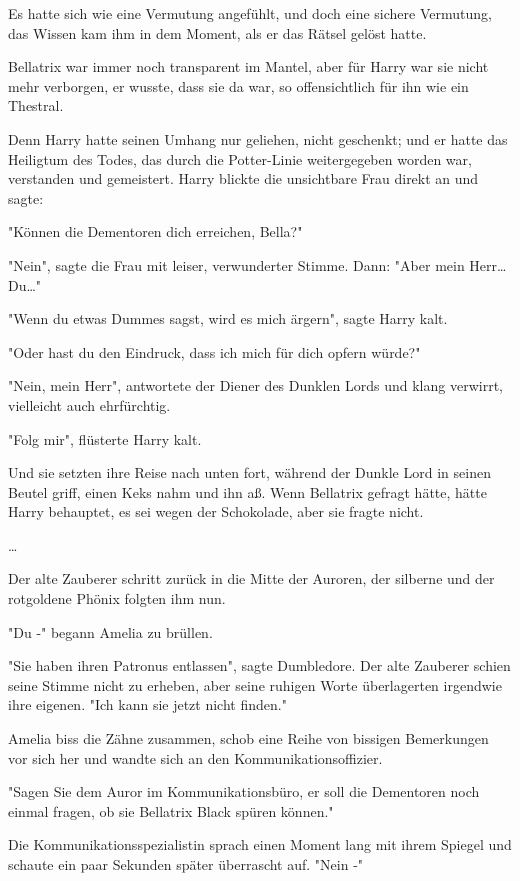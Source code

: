 {Es hatte sich wie eine Vermutung angefühlt, und doch eine sichere Vermutung, das Wissen kam ihm in dem Moment, als er das Rätsel gelöst hatte.

Bellatrix war immer noch transparent im Mantel, aber für Harry war sie nicht mehr verborgen, er wusste, dass sie da war, so offensichtlich für ihn wie ein Thestral.

Denn Harry hatte seinen Umhang nur geliehen, nicht geschenkt; und er hatte das Heiligtum des Todes, das durch die Potter-Linie weitergegeben worden war, verstanden und gemeistert. Harry blickte die unsichtbare Frau direkt an und sagte:

"Können die Dementoren dich erreichen, Bella?"

"Nein", sagte die Frau mit leiser, verwunderter Stimme. Dann: "Aber mein Herr… Du…"

"Wenn du etwas Dummes sagst, wird es mich ärgern", sagte Harry kalt.

"Oder hast du den Eindruck, dass ich mich für dich opfern würde?"

"Nein, mein Herr", antwortete der Diener des Dunklen Lords und klang verwirrt, vielleicht auch ehrfürchtig.

"Folg mir", flüsterte Harry kalt.

Und sie setzten ihre Reise nach unten fort, während der Dunkle Lord in seinen Beutel griff, einen Keks nahm und ihn aß. Wenn Bellatrix gefragt hätte, hätte Harry behauptet, es sei wegen der Schokolade, aber sie fragte nicht.

…

Der alte Zauberer schritt zurück in die Mitte der Auroren, der silberne und der rotgoldene Phönix folgten ihm nun.

"Du -" begann Amelia zu brüllen.

"Sie haben ihren Patronus entlassen", sagte Dumbledore. Der alte Zauberer schien seine Stimme nicht zu erheben, aber seine ruhigen Worte überlagerten irgendwie ihre eigenen. "Ich kann sie jetzt nicht finden."

Amelia biss die Zähne zusammen, schob eine Reihe von bissigen Bemerkungen vor sich her und wandte sich an den Kommunikationsoffizier.

"Sagen Sie dem Auror im Kommunikationsbüro, er soll die Dementoren noch einmal fragen, ob sie Bellatrix Black spüren können."

Die Kommunikationsspezialistin sprach einen Moment lang mit ihrem Spiegel und schaute ein paar Sekunden später überrascht auf. "Nein -"

}
